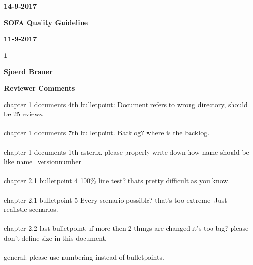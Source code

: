 \documentclass{report}
\begin{document}
\textbf{14-9-2017}


\textbf{SOFA Quality Guideline}


\textbf{11-9-2017}


\textbf{1}


\textbf{Sjoerd Brauer}



\textbf{Reviewer Comments}

chapter 1 documents 4th bulletpoint:
Document refers to wrong directory, should be 25reviews.
~\\
~\\
chapter 1 documents 7th bulletpoint.
Backlog? where is the backlog. 
~\\
~\\
chapter 1 documents 1th asterix.
please properly write down how name should be like name\_versionnumber
~\\
~\\
chapter 2.1 bulletpoint 4
100\% line test? thats pretty difficult as you know.
~\\
~\\
chapter 2.1 bulletpoint 5
Every scenario possible? that's too extreme. Just realistic scenarios.
~\\
~\\
chapter 2.2 last bulletpoint.
if more then 2 things are changed it's too big? please don't define size in this document.
~\\
~\\

general: please use numbering instead of bulletpoints.
\end{document}
